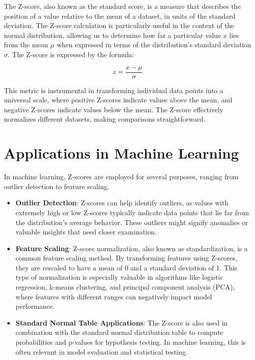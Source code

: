\documentclass[
  12 pt,
  a4paper,
]{book}
\numberwithin{equation}{section}
\theoremstyle{plain}      %
\theoremstyle{definition} %
\theoremstyle{remark}     %
\theoremstyle{note}         %
\begin{document}
The Z-score, also known as the standard score, is a measure that
describes the position of a value relative to the mean of a dataset, in
units of the standard deviation. The Z-score calculation is particularly
useful in the context of the normal distribution, allowing us to
determine how far a particular value \(x\) lies from the mean \(\mu\)
when expressed in terms of the distribution's standard deviation
\(\sigma\). The Z-score is expressed by the formula:

\[
 z = \frac{x - \mu}{\sigma}
\]

This metric is instrumental in transforming individual data points into
a universal scale, where positive Z-scores indicate values above the
mean, and negative Z-scores indicate values below the mean. The Z-score
effectively normalizes different datasets, making comparisons
straightforward.

\hypertarget{applications-in-machine-learning-1}{%
\section{Applications in Machine
Learning}\label{applications-in-machine-learning-1}}

In machine learning, Z-scores are employed for several purposes, ranging
from outlier detection to feature scaling.

\begin{itemize}
\item
  \textbf{Outlier Detection}: Z-scores can help identify outliers, as
  values with extremely high or low Z-scores typically indicate data
  points that lie far from the distribution's average behavior. These
  outliers might signify anomalies or valuable insights that need closer
  examination.
\item
  \textbf{Feature Scaling}: Z-score normalization, also known as
  standardization, is a common feature scaling method. By transforming
  features using Z-scores, they are rescaled to have a mean of 0 and a
  standard deviation of 1. This type of normalization is especially
  valuable in algorithms like logistic regression, k-means clustering,
  and principal component analysis (PCA), where features with different
  ranges can negatively impact model performance.
\item
  \textbf{Standard Normal Table Applications}: The Z-score is also used
  in combination with the standard normal distribution table to compute
  probabilities and p-values for hypothesis testing. In machine
  learning, this is often relevant in model evaluation and statistical
  testing.
\end{itemize}
\end{document}
